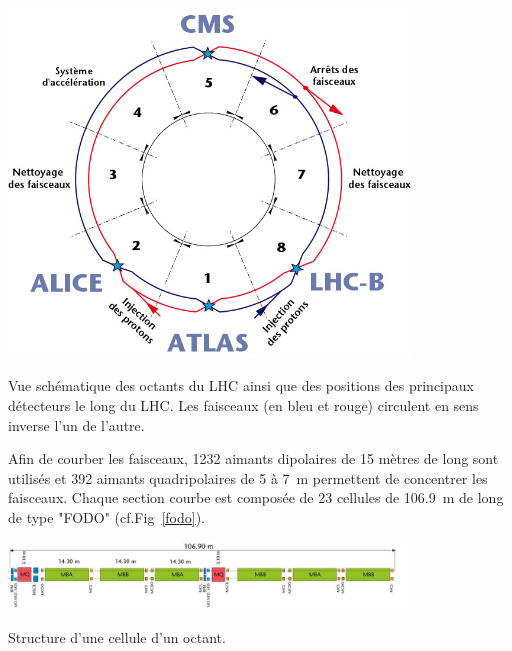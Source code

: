 \begin{minipagewithmarginpars}[ht!]{0.95\textwidth}
	\centering
	\includegraphics[width=0.80\textwidth]{LHC/lhc-schematic.jpg}
	\captionsetup{type=figure}\caption{Vue schématique des octants du LHC ainsi que des positions des principaux détecteurs le long du LHC. Les faisceaux (en bleu et rouge) circulent en sens inverse l'un de l'autre.}
	\label{octants}	
\end{minipagewithmarginpars}

Afin de courber les faisceaux, \num{1232} aimants dipolaires de \num{15} mètres de long sont utilisés et \num{392} aimants quadripolaires de \num{5} à \SI{7}{\meter} permettent de concentrer les faisceaux. Chaque section courbe est composée de \num{23} cellules de \SI{106.9}{\meter} de long de type "FODO" (cf.Fig~\ref{fodo}).

\begin{minipagewithmarginpars}[ht!]{0.95\textwidth}
	\centering
	\includegraphics[width=0.8\textwidth]{LHC/arc.jpg}
	\captionsetup{type=figure}\caption{Structure d'une cellule d'un octant.}
	\label{fodo}	
\end{minipagewithmarginpars}

